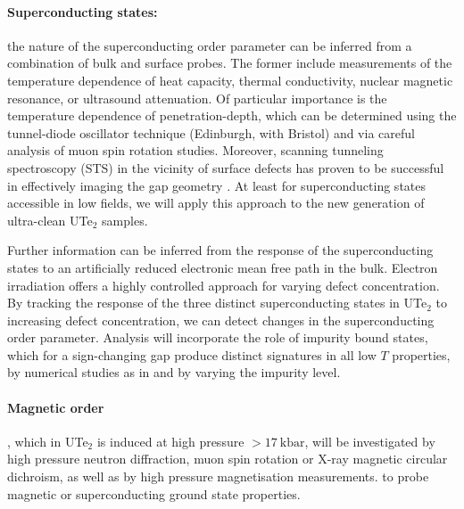 \paragraph{Superconducting states:} the nature of the superconducting order parameter can be inferred from a combination of bulk and surface probes. The former include measurements of the temperature dependence of heat capacity, thermal conductivity, nuclear magnetic resonance, or ultrasound attenuation. Of particular importance is the temperature dependence of penetration-depth, which can be determined using the tunnel-diode oscillator technique (Edinburgh, with Bristol) and via careful analysis of muon spin rotation studies.
Moreover, scanning tunneling spectroscopy (STS) in the vicinity of surface defects has proven to be successful in effectively imaging the gap geometry \cite{}. At least for superconducting states accessible in low fields, we will apply this approach to the new generation of ultra-clean UTe$_2$ samples. 

Further information can be inferred from the response of the superconducting states to an artificially reduced electronic mean free path in the bulk. Electron irradiation offers a highly controlled approach for varying defect concentration. By tracking the response of the three distinct superconducting states in UTe$_2$ to increasing defect concentration, we can detect changes in the superconducting order parameter.
Analysis will incorporate the role of impurity bound states, which for a sign-changing gap produce distinct signatures in  all low $T$ properties, by numerical studies as in \cite{bang17} and by varying the impurity level.



\paragraph{Magnetic order}, which in UTe$_2$ is induced at high pressure $>\SI{17}{\kilo\bar}$, will be investigated by high pressure neutron diffraction, muon spin rotation or X-ray magnetic circular dichroism, as well as by high pressure magnetisation measurements.  to probe magnetic or superconducting ground state properties. 
